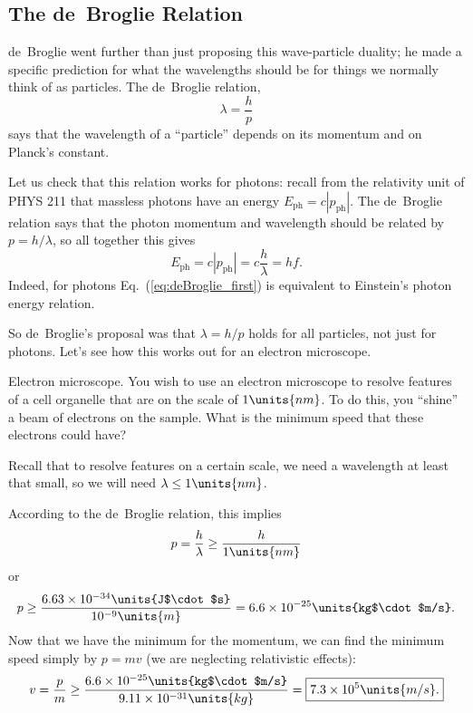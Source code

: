 \subsection{The de~Broglie Relation}

de~Broglie went further than just proposing this wave-particle
duality; he made a specific prediction for what the wavelengths
should be for things we normally think of as particles.  The 
de~Broglie relation,
\begin{equation}
\lambda = \frac{h}{p}
\label{eq:deBroglie_first}
\end{equation}
says that the wavelength of a ``particle'' depends on its momentum and
on Planck's constant.

Let us check that this relation works for photons: recall from the
relativity unit of PHYS 211 that massless photons have an energy
$E_\text{ph} = c|p_\text{ph}|$.  The de~Broglie relation says that the
photon momentum and wavelength should be related by $p=h/\lambda$, so
all together this gives
\begin{equation}
E_\text{ph} = c |p_\text{ph}| = c\frac{h}{\lambda} = hf.
\end{equation}
Indeed, for photons Eq.~(\ref{eq:deBroglie_first}) is equivalent to
Einstein's photon energy relation.

So de~Broglie's proposal was that $\lambda=h/p$ holds for all
particles, not just for photons.  Let's see how this works out for an
electron microscope.

\begin{example}{Electron microscope.}
You wish to use an electron microscope to resolve features of a cell
organelle that are on the scale of $1\units{nm}$.  To do this, you
``shine'' a beam of electrons on the sample.  What is the minimum
speed that these electrons could have?  
\begin{solution}
Recall that to
resolve features on a certain scale, we need a wavelength at least
that small, so we will need $\lambda \leq 1\units{nm}$.

According to the de~Broglie relation, this implies
\begin{equation}
  p = \frac{h}{\lambda} \geq \frac{h}{1\units{nm}}  
\end{equation}
or
\begin{equation}
  p \geq \frac{6.63\times 10^{-34}\units{J$\cdot$s}}{10^{-9}\units{m}}
  = 6.6\times 10^{-25}\units{kg$\cdot$m/s}.
\end{equation}
Now that we have the minimum for the momentum, we can find the 
minimum speed simply by $p=mv$ (we are neglecting relativistic
effects):
\begin{equation}
  v = \frac{p}{m} \geq \frac{6.6\times 10^{-25}\units{kg$\cdot$m/s}}
  {9.11\times 10^{-31}\units{kg}} = \boxed{7.3\times 10^5\units{m/s}.}
\end{equation}
\end{solution}
\end{example}

